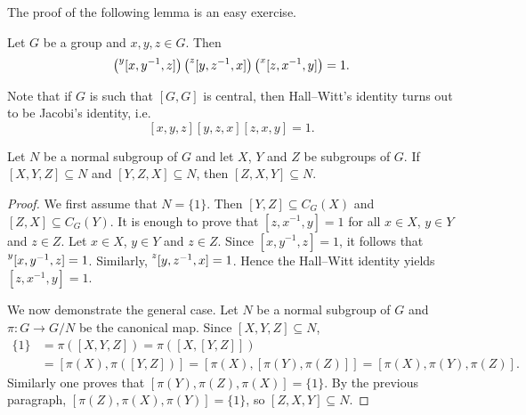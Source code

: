 The proof of the following lemma is an easy exercise.

\begin{lemma}
	\label{xca:HallWitt}
	Let $G$ be a group and $x,y,z\in G$. Then 
	\begin{equation}
		\label{eq:HallWitt}
	\left(\prescript{y}{}[x,y^{-1},z]\right)\left(\prescript{z}{}[y,z^{-1},x]\right)\left(\prescript{x}{}[z,x^{-1},y]\right)=1.
	\end{equation}
\end{lemma}

Note that if $G$ is such that $[G,G]$ is central, then Hall--Witt's identity 
turns out to be Jacobi's identity, i.e. 
\[ [x,y,z][y,z,x][z,x,y]=1.\]  

%

\begin{lemma}
	\label{lemma:3subgrupos_general}
	Let $N$ be a normal subgroup of $G$ and let $X$, $Y$ and $Z$
	be subgroups of $G$. If $[X,Y,Z]\subseteq N$ and $[Y,Z,X]\subseteq N$, then 
	$[Z,X,Y]\subseteq N$.
\end{lemma}

\begin{proof}
	We first assume that $N=\{1\}$. Then
	$[Y,Z]\subseteq C_G(X)$ and $[Z,X]\subseteq C_G(Y)$. It
	is enough to prove that $[z,x^{-1},y]=1$ for all $x\in X$, $y\in Y$ and $z\in Z$. 
	Let $x\in X$, $y\in Y$ and $z\in Z$. Since $[x,y^{-1},z]=1$, it follows that 
	$\prescript{y}{}[x,y^{-1},z]=1$.
	Similarly, $\prescript{z}{}[y,z^{-1},x]=1$. Hence the 
	Hall--Witt identity yields 
	$[z,x^{-1},y]=1$.

	We now demonstrate the general case. Let $N$ be a normal subgroup of $G$ 
	and $\pi\colon G\to G/N$ be the canonical map. Since $[X,Y,Z]\subseteq N$, 
	\begin{align*}
		\{1\}&=\pi([X,Y,Z])=\pi([ X,[Y,Z]])\\
		&=[\pi(X),\pi([Y,Z])]=[ \pi(X),[\pi(Y),\pi(Z)]]=[\pi(X),\pi(Y),\pi(Z)]. 
	\end{align*}
	Similarly one proves that $[\pi(Y),\pi(Z),\pi(X)]=\{1\}$. By the previous paragraph,  
	$[\pi(Z),\pi(X),\pi(Y)]=\{1\}$, so $[Z,X,Y]\subseteq N$.
\end{proof}

